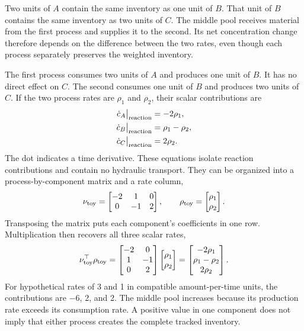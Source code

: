 Two units of $A$ contain the same inventory as one unit of $B$. That unit of $B$ contains the same inventory as two units of $C$. The middle pool receives material from the first process and supplies it to the second. Its net concentration change therefore depends on the difference between the two rates, even though each process separately preserves the weighted inventory.

The first process consumes two units of $A$ and produces one unit of $B$. It has no direct effect on $C$. The second consumes one unit of $B$ and produces two units of $C$. If the two process rates are $\rho_1$ and $\rho_2$, their scalar contributions are
\[
\begin{aligned}
\dot c_A\big|_{\rm reaction}&=-2\rho_1,\\
\dot c_B\big|_{\rm reaction}&=\rho_1-\rho_2,\\
\dot c_C\big|_{\rm reaction}&=2\rho_2.
\end{aligned}
\]
The dot indicates a time derivative. These equations isolate reaction contributions and contain no hydraulic transport. They can be organized into a process-by-component matrix and a rate column,
\[
\nu_{\rm toy}=\begin{bmatrix}-2&1&0\\0&-1&2\end{bmatrix},\qquad
\rho_{\rm toy}=\begin{bmatrix}\rho_1\\\rho_2\end{bmatrix}.
\]
Transposing the matrix puts each component's coefficients in one row. Multiplication then recovers all three scalar rates,
\[
\nu_{\rm toy}^\top\rho_{\rm toy}
=\begin{bmatrix}-2&0\\1&-1\\0&2\end{bmatrix}
\begin{bmatrix}\rho_1\\\rho_2\end{bmatrix}
=\begin{bmatrix}-2\rho_1\\\rho_1-\rho_2\\2\rho_2\end{bmatrix}.
\]
For hypothetical rates of 3 and 1 in compatible amount-per-time units, the contributions are $-6$, 2, and 2. The middle pool increases because its production rate exceeds its consumption rate. A positive value in one component does not imply that either process creates the complete tracked inventory.


